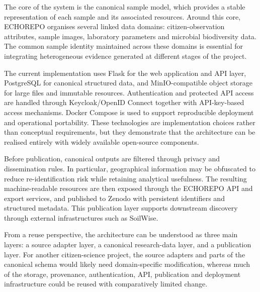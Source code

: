 The core of the system is the canonical sample model, which provides a stable representation of each sample and its associated resources. Around this core, ECHOREPO organises several linked data domains: citizen-observation attributes, sample images, laboratory parameters and microbial biodiversity data. The common sample identity maintained across these domains is essential for integrating heterogeneous evidence generated at different stages of the project.

The current implementation uses Flask for the web application and API layer, PostgreSQL for canonical structured data, and MinIO-compatible object storage for large files and immutable resources. Authentication and protected API access are handled through Keycloak/OpenID Connect together with API-key-based access mechanisms. Docker Compose is used to support reproducible deployment and operational portability. These technologies are implementation choices rather than conceptual requirements, but they demonstrate that the architecture can be realised entirely with widely available open-source components.

Before publication, canonical outputs are filtered through privacy and dissemination rules. In particular, geographical information may be obfuscated to reduce re-identification risk while retaining analytical usefulness. The resulting machine-readable resources are then exposed through the ECHOREPO API and export services, and published to Zenodo with persistent identifiers and structured metadata. This publication layer supports downstream discovery through external infrastructures such as SoilWise.

From a reuse perspective, the architecture can be understood as three main layers: a source adapter layer, a canonical research-data layer, and a publication layer. For another citizen-science project, the source adapters and parts of the canonical schema would likely need domain-specific modification, whereas much of the storage, provenance, authentication, API, publication and deployment infrastructure could be reused with comparatively limited change.